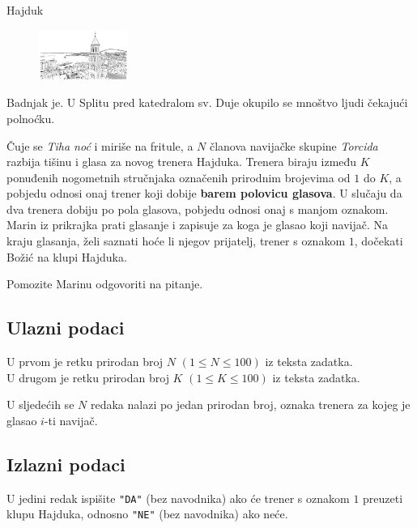 \begin{statement}[
  problempoints=30,
  timelimit=1 sekunda,
  memorylimit=512 MiB,
]{Hajduk}

\setlength\intextsep{-0.1cm}
\begin{figure}
\centering
\includegraphics[width=0.26\textwidth]{img/split.png}
\end{figure}

Badnjak je. U Splitu pred katedralom sv. Duje okupilo se mnoštvo ljudi čekajući
polnoćku.

Čuje se \textit{Tiha noć} i miriše na fritule, a $N$ članova navijačke skupine
\textit{Torcida} razbija tišinu i glasa za novog trenera Hajduka. Trenera biraju
između $K$ ponuđenih nogometnih stručnjaka označenih prirodnim brojevima od $1$
do $K$, a pobjedu odnosi onaj trener koji dobije \textbf{barem polovicu
glasova}.  U slučaju da dva trenera dobiju po pola glasova, pobjedu odnosi
onaj s manjom oznakom.  Marin iz prikrajka prati glasanje i zapisuje za koga
je glasao koji navijač.  Na kraju glasanja, želi saznati hoće li njegov
prijatelj, trener s oznakom $1$, dočekati Božić na klupi Hajduka.

Pomozite Marinu odgovoriti na pitanje.


\subsection*{Ulazni podaci}
U prvom je retku prirodan broj $N$ $(1 \le N \le 100)$ iz teksta zadatka.\\
U drugom je retku prirodan broj $K$ $(1 \le K \le 100)$ iz teksta zadatka.

U sljedećih se $N$ redaka nalazi po jedan prirodan broj, oznaka trenera za kojeg
je glasao $i$-ti navijač.

\subsection*{Izlazni podaci}
U jedini redak ispišite \texttt{"DA"} (bez navodnika) ako će trener s oznakom
$1$ preuzeti klupu Hajduka, odnosno \texttt{"NE"} (bez navodnika) ako neće.


\end{statement}
